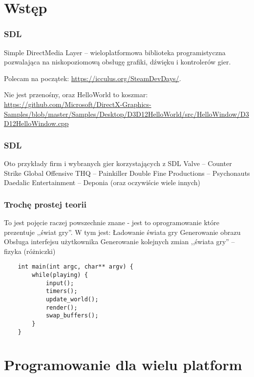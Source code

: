 \documentclass{beamer}
\begin{document}
\section{Wstęp}

\begin{frame}[fragile]
    \frametitle{SDL}
    Simple DirectMedia Layer -- wieloplatformowa biblioteka programistyczna pozwalająca na niskopoziomową obsługę grafiki, dźwięku i kontrolerów gier.
    
    Polecam na początek: \url{https://icculus.org/SteamDevDays/}.
    \EB
    
    Nie jest przenośny, oraz HelloWorld to koszmar:
     \url{https://github.com/Microsoft/DirectX-Graphics-Samples/blob/master/Samples/Desktop/D3D12HelloWorld/src/HelloWindow/D3D12HelloWindow.cpp}
    \EB
\end{frame}

\begin{frame}[fragile]
    \frametitle{SDL}
    Oto przykłady firm i wybranych gier korzystających z SDL
    \BI
    \I Valve -- Counter Strike Global Offensive
    \I THQ -- Painkiller
    \I Double Fine Productions -- Psychonauts
    \I Daedalic Entertainment -- Deponia
    \I (oraz oczywiście wiele innych)
    \EI
    \EB
\end{frame}


\begin{frame}[fragile]
    \frametitle{Trochę prostej teorii}
    To jest pojęcie raczej powszechnie znane - jest to oprogramowanie które prezentuje ,,świat gry''.
    W tym jest:
    \BI
     \I Ładowanie świata gry
     \I Generowanie obrazu 
     \I Obsługa interfejsu użytkownika
     \I Generowanie kolejnych zmian ,,świata gry'' -- fizyka (różniczki)
    \EI
    \EB
\end{frame}


\begin{frame}[fragile]
    \begin{verbatim}
    int main(int argc, char** argv) {
        while(playing) {
            input();
            timers();
            update_world();
            render();
            swap_buffers();
        }
    }
    \end{verbatim}
    \EB
\end{frame}


\section{Programowanie dla wielu platform}
\end{document}
